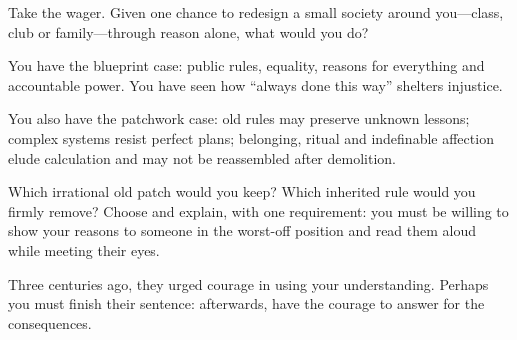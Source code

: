 Take the wager. Given one chance to redesign a small society around you---class, club or family---through reason alone, what would you do?

You have the blueprint case: public rules, equality, reasons for everything and accountable power. You have seen how ``always done this way'' shelters injustice.

You also have the patchwork case: old rules may preserve unknown lessons; complex systems resist perfect plans; belonging, ritual and indefinable affection elude calculation and may not be reassembled after demolition.

Which irrational old patch would you keep? Which inherited rule would you firmly remove? Choose and explain, with one requirement: you must be willing to show your reasons to someone in the worst-off position and read them aloud while meeting their eyes.

Three centuries ago, they urged courage in using your understanding. Perhaps you must finish their sentence: afterwards, have the courage to answer for the consequences.
